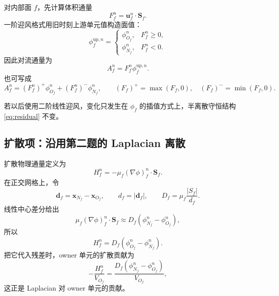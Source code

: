 \documentclass[UTF8,12pt,a4paper]{ctexart}
\numberwithin{equation}{section}
\newcommand{\Sf}{\bm S}
\newcommand{\xf}{\bm x}
\newcommand{\uf}{\bm u}
\begin{document}
对内部面 $f$，先计算体积通量
\begin{equation}
  F_f^n=\uf_f^n\cdot\Sf_f.
  \label{eq:face_flux}
\end{equation}
一阶迎风格式用旧时刻上游单元值构造面值：
\begin{equation}
  \phi_f^{\mathrm{up},n}
  =
  \begin{cases}
    \phi_{O_f}^n,&F_f^n\ge 0,\\
    \phi_{N_f}^n,&F_f^n<0.
  \end{cases}
  \label{eq:upwind}
\end{equation}
因此对流通量为
\begin{equation}
  \boxed{
  A_f^n=F_f^n\phi_f^{\mathrm{up},n}.}
  \label{eq:advective_flux}
\end{equation}
也可写成
\begin{equation}
  A_f^n=(F_f^n)^+\phi_{O_f}^n+(F_f^n)^-\phi_{N_f}^n,
  \qquad
  (F_f)^+=\max(F_f,0),\quad (F_f)^-=\min(F_f,0).
  \label{eq:upwind_split}
\end{equation}

若以后使用二阶线性迎风，变化只发生在 $\phi_f$ 的插值方式上，半离散守恒结构
\eqref{eq:residual} 不变。

\subsection{扩散项：沿用第二题的 Laplacian 离散}

扩散物理通量定义为
\begin{equation}
  H_f^n=-\mu_f(\nabla\phi)^n_f\cdot\Sf_f.
  \label{eq:H_definition}
\end{equation}
在正交网格上，令
\begin{equation}
  \bm d_f=\xf_{N_f}-\xf_{O_f},
  \qquad
  d_f=|\bm d_f|,
  \qquad
  D_f=\mu_f\frac{|S_f|}{d_f}.
  \label{eq:diffusion_coefficient}
\end{equation}
线性中心差分给出
\begin{equation}
  \mu_f(\nabla\phi)^n_f\cdot\Sf_f
  \approx
  D_f(\phi_{N_f}^n-\phi_{O_f}^n),
  \label{eq:orthogonal_laplacian_flux}
\end{equation}
所以
\begin{equation}
  \boxed{
  H_f^n
  =
  D_f(\phi_{O_f}^n-\phi_{N_f}^n).}
  \label{eq:orthogonal_H}
\end{equation}
把它代入残差时，owner 单元的扩散贡献为
\begin{equation}
  -\frac{H_f^n}{V_{O_f}}
  =
  \frac{D_f(\phi_{N_f}^n-\phi_{O_f}^n)}{V_{O_f}},
  \label{eq:owner_diffusion_contribution}
\end{equation}
这正是 Laplacian 对 owner 单元的贡献。
\end{document}
